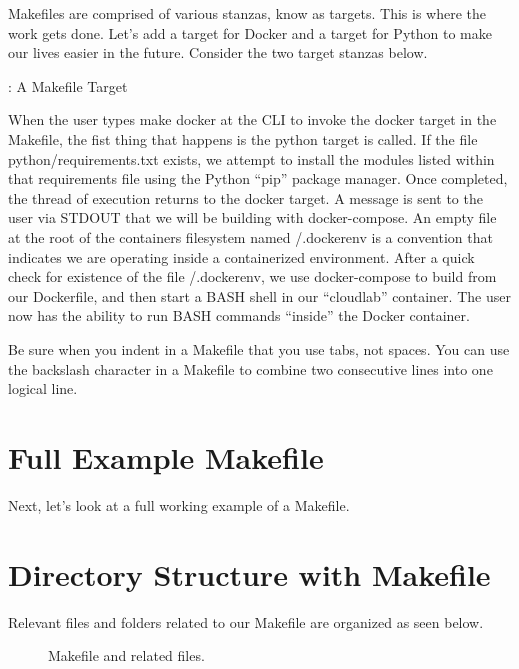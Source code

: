 \justify{}
Makefiles are comprised of various stanzas, know as targets. This is
where the work gets done. Let's add a target for Docker and a target for
Python to make our lives easier in the future. Consider the two target
stanzas below.

\justify{}
\begin{mybox}{\thetcbcounter: A Makefile Target}
	
\end{mybox}

\justify{}
When the user types make docker at the CLI to invoke the docker target in the Makefile, the fist thing that happens is the python target is
called. If the file python/requirements.txt exists, we attempt to install the modules listed within that requirements file using the
Python ``pip'' package manager. Once completed, the thread of execution returns to the docker target. A message is sent to the user via STDOUT
that we will be building with docker-compose. An empty file at the root of the containers filesystem named /.dockerenv is a convention that
indicates we are operating inside a containerized environment. After a quick check for existence of the file /.dockerenv, we use docker-compose
to build from our Dockerfile, and then start a BASH shell in our ``cloudlab'' container. The user now has the ability to run BASH commands
``inside'' the Docker container.

\justify{}
Be sure when you indent in a Makefile that you use tabs, not spaces. You can use the backslash character in a Makefile to combine two consecutive
lines into one logical line.

\section{Full Example Makefile}
\justify{}
Next, let's look at a full working example of a Makefile.

\section{Directory Structure with Makefile}
\justify{}
Relevant files and folders related to our Makefile are organized as seen
below.

\begin{figure}[!htb]
	
	\caption{Makefile and related files.}
\label{makefile}
\end{figure}
